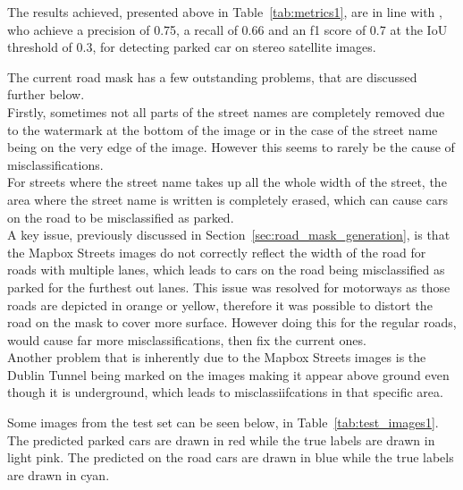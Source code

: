 The results achieved, presented above in Table~\ref{tab:metrics1}, are in line with \cite{similarresults}, who achieve a precision of 0.75, a recall of 0.66 and an f1 score of 0.7 at the IoU threshold of 0.3, for detecting parked car on stereo satellite images.

The current road mask has a few outstanding problems, that are discussed further below.\\
Firstly, sometimes not all parts of the street names are completely removed due to the watermark at the bottom of the image or in the case of the street name being on the very edge of the image. However this seems to rarely be the cause of misclassifications.\\
For streets where the street name takes up all the whole width of the street, the area where the street name is written is completely erased, which can cause cars on the road to be misclassified as parked.\\
A key issue, previously discussed in Section~\ref{sec:road_mask_generation}, is that the Mapbox Streets images do not correctly reflect the width of the road for roads with multiple lanes, which leads to cars on the road being misclassified as parked for the furthest out lanes.
This issue was resolved for motorways as those roads are depicted in orange or yellow, therefore it was possible to distort the road on the mask to cover more surface. However doing this for the regular roads, would cause far more misclassifications, then fix the current ones.\\
Another problem that is inherently due to the Mapbox Streets images is the Dublin Tunnel being marked on the images making it appear above ground even though it is underground, which leads to misclassiifcations in that specific area.

Some images from the test set can be seen below, in Table~\ref{tab:test_images1}.
The predicted parked cars are drawn in red while the true labels are drawn in light pink. The predicted on the road cars are drawn in blue while the true labels are drawn in cyan.

